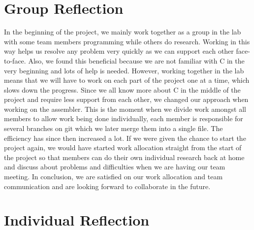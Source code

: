 \documentclass[11pt]{article}
\begin{document}
\section{Group Reflection}
In the beginning of the project, we mainly work together as a group in the lab with some team members programming while others do research. Working in this way helps us resolve any problem very quickly as we can support each other face-to-face. Also, we found this beneficial because we are not familiar with C in the very beginning and lots of help is needed. However, working together in the lab means that we will have to work on each part of the project one at a time, which slows down the progress. Since we all know more about C in the middle of the project and require less support from each other, we changed our approach when working on the assembler. This is the moment when we divide work amongst all members to allow work being done individually, each member is responsible for several branches on git which we later merge them into a single file. The efficiency has since then increased a lot. If we were given the chance to start the project again, we would have started work allocation straight from the start of the project so that members can do their own individual research back at home and discuss about problems and difficulties when we are having our team meeting. In conclusion, we are satisfied on our work allocation and team communication and are looking forward to collaborate in the future.

\section{Individual Reflection}
\end{document}
